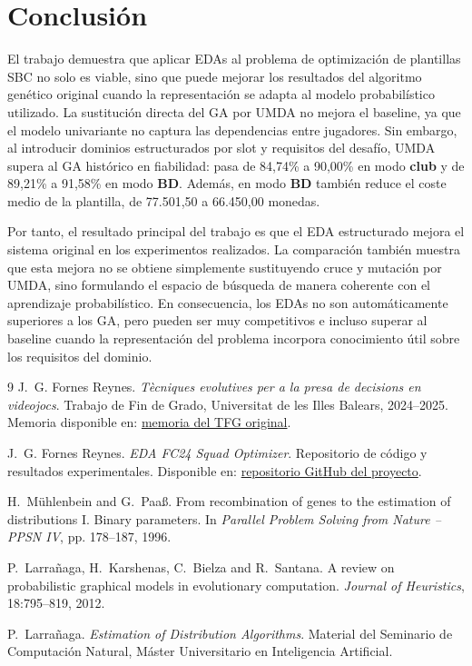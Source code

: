 \documentclass[10pt,a4paper]{article}
\newcommand{\repoUrl}{https://github.com/PepBiel/eda-fc24-squad-optimizer}
\newcommand{\tfgUrl}{https://github.com/PepBiel/eda-fc24-squad-optimizer/blob/main/Treball_Final_de_Grau_vFinal.pdf}
\begin{document}
\section{Conclusión}

El trabajo demuestra que aplicar EDAs al problema de optimización de plantillas SBC no solo es viable, sino que puede mejorar los resultados del algoritmo genético original cuando la representación se adapta al modelo probabilístico utilizado. La sustitución directa del GA por UMDA no mejora el baseline, ya que el modelo univariante no captura las dependencias entre jugadores. Sin embargo, al introducir dominios estructurados por slot y requisitos del desafío, UMDA supera al GA histórico en fiabilidad: pasa de 84,74\% a 90,00\% en modo \textbf{club} y de 89,21\% a 91,58\% en modo \textbf{BD}. Además, en modo \textbf{BD} también reduce el coste medio de la plantilla, de 77.501,50 a 66.450,00 monedas.

Por tanto, el resultado principal del trabajo es que el EDA estructurado mejora el sistema original en los experimentos realizados. La comparación también muestra que esta mejora no se obtiene simplemente sustituyendo cruce y mutación por UMDA, sino formulando el espacio de búsqueda de manera coherente con el aprendizaje probabilístico. En consecuencia, los EDAs no son automáticamente superiores a los GA, pero pueden ser muy competitivos e incluso superar al baseline cuando la representación del problema incorpora conocimiento útil sobre los requisitos del dominio.

\begin{thebibliography}{9}
J.~G. Fornes Reynes.
\newblock \textit{Tècniques evolutives per a la presa de decisions en videojocs}.
\newblock Trabajo de Fin de Grado, Universitat de les Illes Balears, 2024--2025.
\newblock Memoria disponible en: \href{\tfgUrl}{memoria del TFG original}.

J.~G. Fornes Reynes.
\newblock \textit{EDA FC24 Squad Optimizer}.
\newblock Repositorio de código y resultados experimentales.
\newblock Disponible en: \href{\repoUrl}{repositorio GitHub del proyecto}.

H.~Mühlenbein and G.~Paaß.
\newblock From recombination of genes to the estimation of distributions I. Binary parameters.
\newblock In \textit{Parallel Problem Solving from Nature -- PPSN IV}, pp. 178--187, 1996.

P.~Larrañaga, H.~Karshenas, C.~Bielza and R.~Santana.
\newblock A review on probabilistic graphical models in evolutionary computation.
\newblock \textit{Journal of Heuristics}, 18:795--819, 2012.

P.~Larrañaga.
\newblock \textit{Estimation of Distribution Algorithms}.
\newblock Material del Seminario de Computación Natural, Máster Universitario en Inteligencia Artificial.
\end{thebibliography}
\end{document}
